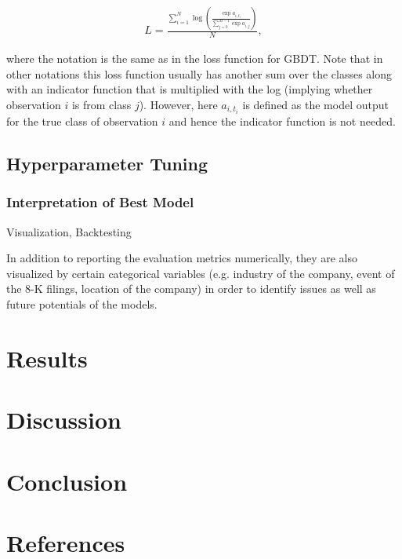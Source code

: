 \documentclass{article}
\begin{document}
	\begin{align}
	L = \frac{\sum_{i = 1}^N \log \left(\frac{\exp a_{i, t_i}}{\sum_{j = 0}^{M-1} \exp a_{i, j}}\right)}{N}, 
	\end{align}
	
	where the notation is the same as in the loss function for GBDT. Note that in other notations this loss function usually has another sum over the classes along with an indicator function that is multiplied with the log (implying whether observation $i$ is from class $j$). However, here $a_{i, t_i}$ is defined as the model output for the true class of observation $i$ and hence the indicator function is not needed.
	

	

	
	
	
	\subsection{Hyperparameter Tuning}
	
	
	\subsubsection{Interpretation of Best Model}
	
	Visualization, Backtesting
	
	In addition to reporting the evaluation metrics numerically, they are also visualized by certain categorical variables (e.g. industry of the company, event of the 8-K filings, location of the company) in order to identify issues as well as future potentials of the models. 
	
	\section{Results}

	\section{Discussion}
	
	\section{Conclusion}
	
	\section{References}
	
\printbibliography
\end{document}
